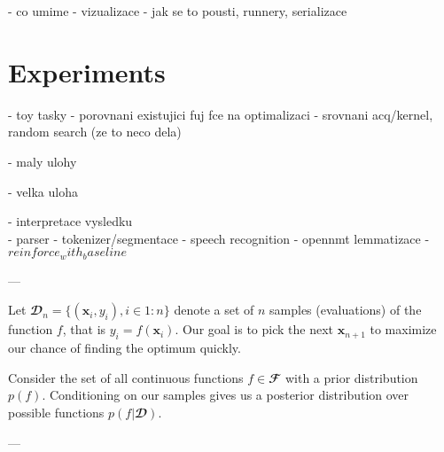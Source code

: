 - co umime
- vizualizace
- jak se to pousti, runnery, serializace
\\



\chapter{Experiments}

- toy tasky
  - porovnani existujici fuj fce na optimalizaci
  - srovnani acq/kernel, random search (ze to neco dela)

- maly ulohy

- velka uloha

- interpretace vysledku
\\





- parser
- tokenizer/segmentace
- speech recognition
- opennmt lemmatizace
- $reinforce_with_baseline$





---

Let $𝓓_n = \{ (\symbf{x}_i, y_i), i \in 1:n\}$ denote a set of $n$ samples
(evaluations) of the function $f$, that is $y_i = f(\symbf{x}_i)$. Our goal is
to pick the next $\symbf{x}_{n+1}$ to maximize our chance of finding the
optimum quickly.

Consider the set of all continuous functions $f ∈ 𝓕$ with a prior distribution
$p(f)$.  Conditioning on our samples gives us a posterior distribution over
possible functions $p(f | 𝓓)$.

---

